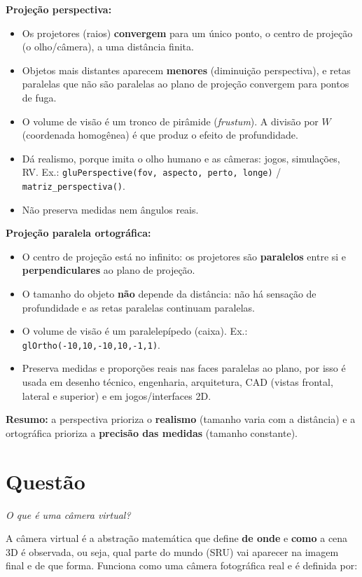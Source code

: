 \documentclass{article}
\newcounter{questao}
\newcommand{\questao}[1]{%
      \stepcounter{questao}%
      \section*{Questão \arabic{questao}}%
      \textit{#1}\par\medskip}
\begin{document}
\textbf{Projeção perspectiva:}
\begin{itemize}
      \item Os projetores (raios) \textbf{convergem} para um único ponto, o centro de projeção (o olho/câmera), a uma distância finita.
      \item Objetos mais distantes aparecem \textbf{menores} (diminuição perspectiva), e retas paralelas que não são paralelas ao plano de projeção convergem para pontos de fuga.
      \item O volume de visão é um tronco de pirâmide (\textit{frustum}). A divisão por $W$ (coordenada homogênea) é que produz o efeito de profundidade.
      \item Dá realismo, porque imita o olho humano e as câmeras: jogos, simulações, RV. Ex.: \texttt{gluPerspective(fov, aspecto, perto, longe)} / \texttt{matriz\_perspectiva()}.
      \item Não preserva medidas nem ângulos reais.
\end{itemize}

\textbf{Projeção paralela ortográfica:}
\begin{itemize}
      \item O centro de projeção está no infinito: os projetores são \textbf{paralelos} entre si e \textbf{perpendiculares} ao plano de projeção.
      \item O tamanho do objeto \textbf{não} depende da distância: não há sensação de profundidade e as retas paralelas continuam paralelas.
      \item O volume de visão é um paralelepípedo (caixa). Ex.: \texttt{glOrtho(-10,10,-10,10,-1,1)}.
      \item Preserva medidas e proporções reais nas faces paralelas ao plano, por isso é usada em desenho técnico, engenharia, arquitetura, CAD (vistas frontal, lateral e superior) e em jogos/interfaces 2D.
\end{itemize}

\textbf{Resumo:} a perspectiva prioriza o \textbf{realismo} (tamanho varia com a distância) e a ortográfica prioriza a \textbf{precisão das medidas} (tamanho constante).

\questao{O que é uma câmera virtual?}

A câmera virtual é a abstração matemática que define \textbf{de onde} e \textbf{como} a cena 3D é observada, ou seja, qual parte do mundo (SRU) vai aparecer na imagem final e de que forma. Funciona como uma câmera fotográfica real e é definida por:
\end{document}
